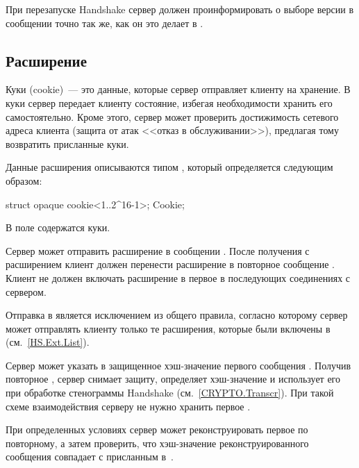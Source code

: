 При перезапуске Handshake сервер должен проинформировать о выборе версии в
сообщении  точно так же, как он это делает в
.

\subsection{Расширение }\label{HS.Ext.c}

Куки (cookie)~--- это данные, которые сервер отправляет клиенту на хранение. 
%
В куки сервер передает клиенту состояние, избегая необходимости хранить его 
самостоятельно.
%
Кроме этого, сервер может проверить достижимость сетевого адреса клиента 
(защита от атак <<отказ в обслуживании>>), предлагая тому возвратить присланные 
куки.

Данные расширения  описываются типом , который 
определяется следующим образом:

\begin{codeblock}
struct {
  opaque cookie<1..2^16-1>;
} Cookie;
\end{codeblock}

В поле  содержатся куки.

Сервер может отправить расширение  в сообщении
. 
%
После получения  с расширением  
клиент должен перенести расширение в повторное сообщение 
.
%
Клиент не должен включать расширение в первое  в 
последующих соединениях с сервером.

\begin{note}
Отправка  в  является исключением 
из общего правила, согласно которому сервер может отправлять клиенту только те 
расширения, которые были включены в 
(см.~\ref{HS.Ext.List}).
\end{note}

Сервер может указать в  защищенное хэш-значение первого 
сообщения . Получив повторное 
, сервер снимает защиту, определяет хэш-значение и   
использует его при обработке стенограммы Handshake (см.~\ref{CRYPTO.Transcr}).
%
При такой схеме взаимодействия серверу не нужно хранить первое 
. 

\begin{note}
При определенных условиях сервер может реконструировать первое
 по повторному, а затем проверить, что хэш-значение
реконструированного сообщения совпадает с присланным в~.
\end{note}

